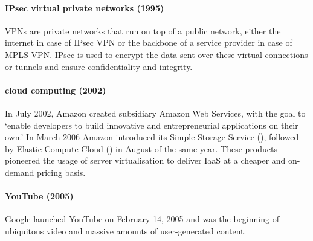 {\paragraph{IPsec virtual private networks (1995)}%
\Glspl{VPN} are private networks that run on top of a public network, either the internet in case of IPsec \gls{VPN} or the backbone of a service provider in case of \acs{MPLS} \gls{VPN}.
IPsec is used to encrypt the data sent over these virtual connections or tunnels and ensure confidentiality and integrity.


\paragraph{cloud computing (2002)}%
In July 2002, Amazon created subsidiary Amazon Web Services, with the goal to `enable developers to build innovative and entrepreneurial applications on their own.'
In March 2006 Amazon introduced its Simple Storage Service (), followed by Elastic Compute Cloud () in August of the same year.
These products pioneered the usage of server virtualisation to deliver IaaS at a cheaper and on-demand pricing basis.

\paragraph{YouTube (2005)}
Google launched YouTube on February 14, 2005 and was the beginning of ubiquitous video and massive amounts of user-generated content.


}


\label{sec:routing-schemes}

